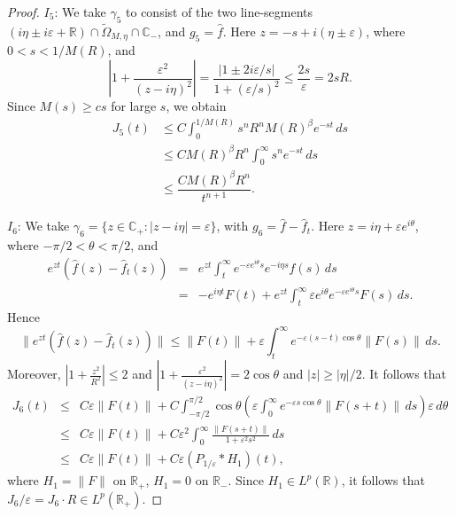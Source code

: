 \documentclass[11pt]{amsart}
\theoremstyle{definition}
\theoremstyle{remark}
\numberwithin{equation}{section}
\begin{document}
\begin{proof}
\noindent $I_5$:  We take $\gamma_5$ to consist of the two line-segments $(i\eta  \pm i{{\varepsilon}} + {{\mathbb R}}) \cap \widetilde \Omega_{M,\eta} \cap {{\mathbb C}}_-$,  and $g_5 = \widehat f$.  Here $z = -s + i(\eta \pm {{\varepsilon}})$, where $0 < s <  1/M(R)$, and
\[
\left| 1 + \frac{{{\varepsilon}}^2}{(z-i\eta)^2} \right| = \frac{|1 \pm 2i{{\varepsilon}}/s|}{1+({{\varepsilon}}/s)^2} \le \frac{2s}{{\varepsilon}} = 2sR.
\]
Since $M(s)\ge cs$ for large $s$, we obtain
\begin{align*}
J_5(t) &\le C \int_0^{1/M(R)} s^n R^n M(R)^\beta e^{-st} \,ds \\
&\le 
C M(R)^\beta R^n \int_0^{\infty} s^n e^{-st} \, ds \\
&\le  \dfrac{C M(R)^\beta R^n}{t^{n+1}}.
 \end{align*}

\noindent $I_6$:  We take $\gamma_6 = \{z\in {{\mathbb C}}_+: |z-i\eta| = {{\varepsilon}}\}$, with $g_6 = \widehat f - \widehat f_t$.  Here $z = i\eta + {{\varepsilon}} e^{i\theta}$, where $-\pi/2 <\theta < \pi/2$, and
\begin{eqnarray*}
e^{zt} (\widehat f(z) - \widehat f_t(z)) &=& e^{zt} \int_t^\infty e^{-{{\varepsilon}} e^{i\theta} s} e^{-i\eta s} f(s) \, ds \\
&=&  - e^{i \eta t} F(t)   +  e^{zt} \int_t^\infty {{\varepsilon}} e^{i\theta} e^{- {{\varepsilon}} e^{i\theta} s} F(s) \, ds.
\end{eqnarray*}
Hence
\[
\big\| e^{zt} (\widehat f(z) - \widehat f_t(z)) \big\| \le \|F(t)\| + {{\varepsilon}} \int_t^\infty e^{- {{\varepsilon}} (s-t) \cos\theta} \|F(s)\| \, ds.
\]
Moreover, $|1 + \frac{z^2}{R^2}| \le 2$ and $|1 + \frac{{{\varepsilon}}^2}{(z-i\eta)^2}| = 2\cos\theta$ and $|z|\ge |\eta|/2$.  It follows that
\begin{eqnarray*}
J_6(t)
&\le&  C {{\varepsilon}} \|F(t)\| + C \int_{-\pi/2}^{\pi/2} \cos\theta \left({{\varepsilon}} \int_0^\infty e^{- {{\varepsilon}} s \cos\theta } \|F(s+t)\| \, ds \right) {{\varepsilon}} \, d\theta \\
&\le& C {{\varepsilon}} \|F(t)\| + C {{\varepsilon}}^2 \int_0^\infty \frac{\|F(s+t)\|}{1 + {{\varepsilon}}^2 s^2} \, ds \\
&\le& C {{\varepsilon}} \|F(t)\| + C {{\varepsilon}} (P_{1/{{\varepsilon}}} * H_1)(t),
\end{eqnarray*}
where $H_1 = \|F\|$ on ${{\mathbb R}}_+$, $H_1 = 0$ on ${{\mathbb R}}_-$.  Since $H_1 \in L^p({{\mathbb R}})$, it follows that $J_6 / {{\varepsilon}} = J_6 \cdot R \in L^p({{\mathbb R}}_+)$.


\end{proof}
\end{document}
